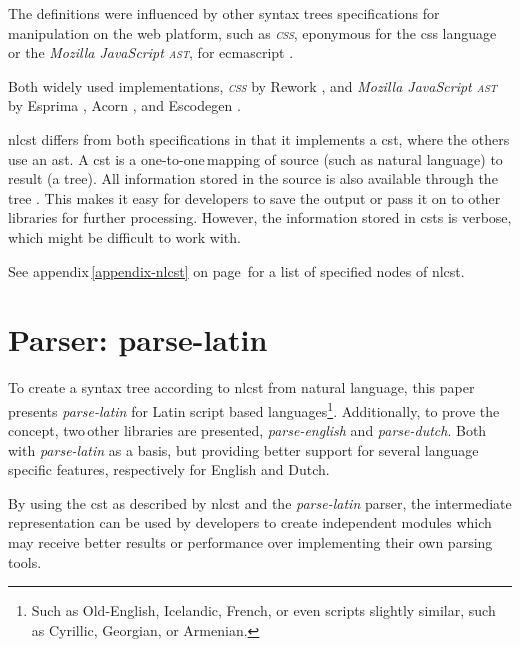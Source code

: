 The definitions were influenced by other syntax trees specifications for
  manipulation on the web platform, such as \emph{\textsc{css}}, eponymous
  for the \acrshort{css} language \autocite{reworkcss/css-source-code} or the
  \emph{Mozilla JavaScript \textsc{ast}}, for \gls{ecmascript}
  \autocite{mozilla.org-spidermonkey-parser_api}.

Both widely used implementations, \emph{\textsc{css}} by Rework
  \autocite{reworkcss/rework-source-code}, and \emph{Mozilla JavaScript
  \textsc{ast}} by Esprima \autocite{ariya/esprima-source-code}, Acorn
  \autocite{marijnh/acorn-source-code}, and Escodegen
  \autocite{constellation/escodegen-source-code}.

\gls{nlcst} differs from both specifications in that it implements a
  \gls{cst}, where the others use an \gls{ast}.
A \gls{cst} is a one-to-one\,mapping of source (such as natural language)
  to result (a tree).
All information stored in the source is also available through the tree
  \autocite{thegreenplace.net-abstract-concrete-syntax-trees}.
This makes it easy for developers to save the output or pass it on to other
  libraries for further processing.
However, the information stored in \glspl{cst} is verbose, which might be
  difficult to work with.

\medskip \noindent See appendix\,\ref{appendix-nlcst} on
  page\,\pageref{appendix-nlcst} for a list of specified nodes of \gls{nlcst}.

\section{Parser: parse-latin}\label{parser-parse-latin}

To create a syntax tree according to \gls{nlcst} from natural language,
  this paper presents \emph{parse-latin} for Latin script based
  languages\footnote{Such
    as Old-English, Icelandic, French, or even scripts slightly similar, such
    as Cyrillic, Georgian, or Armenian.}.
Additionally, to prove the concept, two\,other libraries are presented,
  \emph{parse-english} and \emph{parse-dutch}. Both with \emph{parse-latin}
  as a basis, but providing better support for several language specific
  features, respectively for English and Dutch.

By using the \gls{cst} as described by \gls{nlcst} and the \emph{parse-latin}
  parser, the intermediate representation can be used by developers to
  create independent modules which may receive better results or
  performance over implementing their own parsing tools.


